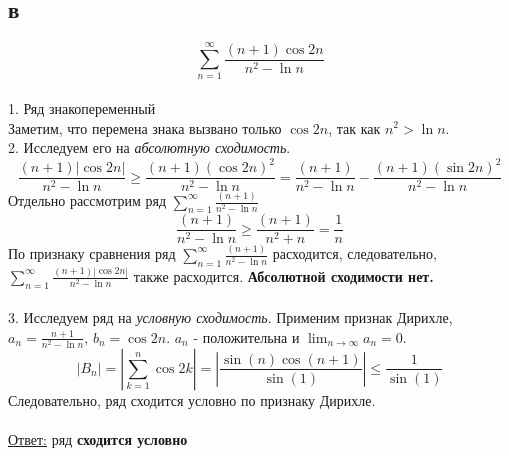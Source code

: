 \documentclass[a5paper, 10pt]{article}
\theoremstyle{definition}
\theoremstyle{plain}
\theoremstyle{remark}
\begin{document}
\subsection{в}
\begin{equation}
\sum \limits_{n = 1}^{\infty} \frac{\left(n+1\right) \cos 2n}{n^2-\ln n}
\end{equation}
\\
1. Ряд знакопеременный\\
Заметим, что перемена знака вызвано только $\cos 2n$, так как $n^2 > \ln n$.\\
2. Исследуем его на \textit{абсолютную сходимость}. \\
\begin{equation}
\frac{\left(n+1\right) \left| \cos 2n \right|}{n^2-\ln n} \geq \frac{\left(n+1\right) \left( \cos 2n \right)^2}{n^2-\ln n}=
\frac{\left(n+1\right)}{n^2-\ln n} - \frac{\left(n+1\right) \left( \sin 2n \right)^2}{n^2-\ln n}
\end{equation}
Отдельно рассмотрим ряд $\sum \limits_{n = 1}^{\infty} \frac{\left(n+1\right)}{n^2-\ln n}$
\begin{equation}
\frac{\left(n+1\right)}{n^2-\ln n} \geq \frac{\left(n+1\right)}{n^2+ n}=  \frac{1}{n}
\end{equation}
По признаку сравнения ряд $\sum \limits_{n = 1}^{\infty} \frac{\left(n+1\right)}{n^2-\ln n}$ расходится, следовательно, $\sum \limits_{n = 1}^{\infty} \frac{\left(n+1\right) \left| \cos 2n \right|}{n^2-\ln n}$ также расходится. \textbf{Абсолютной сходимости нет.}\\\\
3. Исследуем ряд на \textit{условную сходимость}.
Применим признак Дирихле, $a_n = \frac{n+1}{n^2 - \ln n}, \, b_n = \cos 2n$. $a_n$ - положительна и $\lim_{n \to \infty} a_n = 0$.
\begin{equation}
\left| B_n \right| = \left| \sum \limits_{k = 1}^{n}\cos 2k\right| = \left| \frac{\sin(n)\cos(n+1)}{\sin(1)} \right|  \leq \frac{1}{\sin(1)}
\end{equation}
Следовательно, ряд сходится условно по признаку Дирихле.
\\\\
\underline{Ответ:} ряд  \textbf{сходится условно}


\newpage
\end{document}
